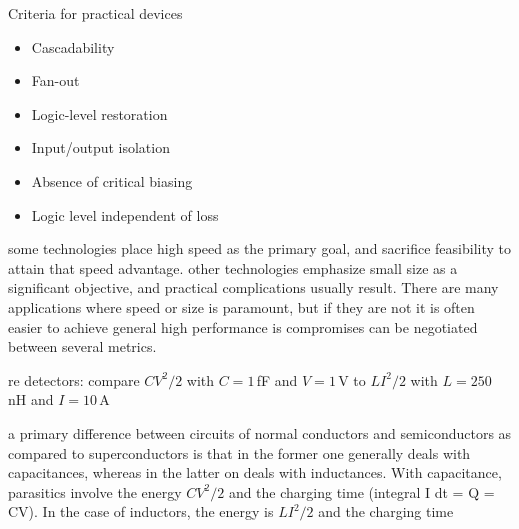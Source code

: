 \vspace{3em}
Criteria for practical devices \cite{mi2010,ke1985a}
\begin{itemize}
\item Cascadability
\item Fan-out
\item Logic-level restoration
\item Input/output isolation
\item Absence of critical biasing
\item Logic level independent of loss
\end{itemize}

\vspace{3em}
some technologies place high speed as the primary goal, and sacrifice feasibility to attain that speed advantage. other technologies emphasize small size as a significant objective, and practical complications usually result. There are many applications where speed or size is paramount, but if they are not it is often easier to achieve general high performance is compromises can be negotiated between several metrics.

\vspace{3em}
re detectors: compare $CV^2/2$ with $C = 1$\,fF and $V = 1$\,V to $LI^2/2$ with $L = 250$\,nH and $I = 10$\,\textmu A \cite{mi2009}

\vspace{3em}
a primary difference between circuits of normal conductors and semiconductors as compared to superconductors is that in the former one generally deals with capacitances, whereas in the latter on deals with inductances. With capacitance, parasitics involve the energy  $CV^2/2$ and the charging time (integral I dt = Q = CV). In the case of inductors, the energy is $LI^2/2$ and the charging time 

